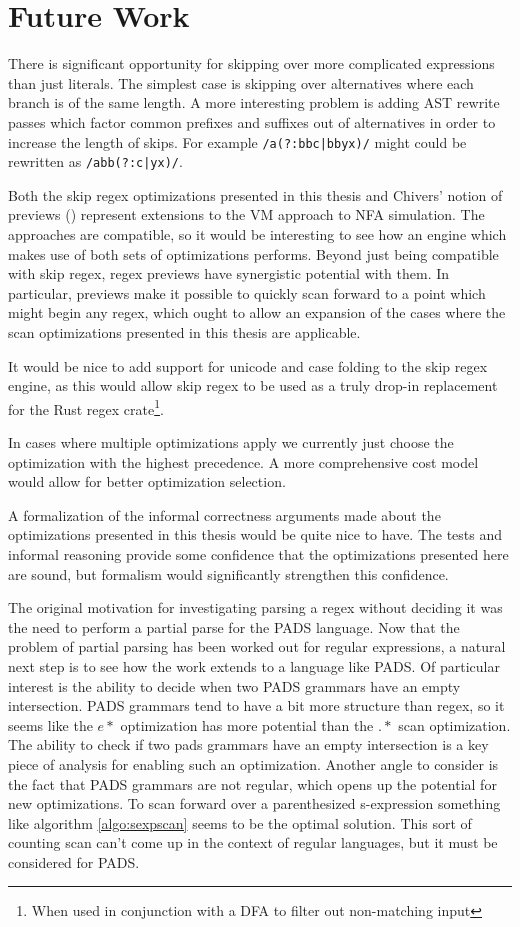 \chapter{Future Work}
\label{chapter:futurework}

There is significant opportunity for skipping over more complicated
expressions than just literals. The simplest case is skipping over
alternatives where each branch is of the same length. A more interesting
problem is adding AST rewrite passes which factor common prefixes and
suffixes out of alternatives in order to increase the length of skips.
For example \verb'/a(?:bbc|bbyx)/' might could be rewritten as
\verb'/abb(?:c|yx)/'.

Both the skip regex optimizations presented in this thesis and
Chivers' notion of previews (\cite{Chivers2016}) represent
extensions to the VM approach to NFA simulation. The approaches
are compatible, so it would be interesting to see how an engine
which makes use of both sets of optimizations performs. Beyond
just being compatible with skip regex, regex previews have
synergistic potential with them. In particular, previews make
it possible to quickly scan forward to a point which might begin
any regex, which ought to allow an expansion of the cases where
the scan optimizations presented in this thesis are applicable.

It would be nice to add support for unicode and case folding to
the skip regex engine, as this would allow skip regex to be used
as a truly drop-in replacement for the Rust regex crate\footnote{
When used in conjunction with a DFA to filter out non-matching
input}.

In cases where multiple optimizations apply we currently just
choose the optimization with the highest precedence. A more comprehensive
cost model would allow for better optimization selection.

A formalization of the informal correctness arguments made about
the optimizations presented in this thesis would be quite nice
to have. The tests and informal reasoning provide some confidence
that the optimizations presented here are sound, but formalism
would significantly strengthen this confidence.

The original motivation for investigating parsing a regex without
deciding it was the need to perform a partial parse for the PADS
language. Now that the problem of partial parsing has been worked
out for regular expressions, a natural next step is to see how
the work extends to a language like PADS. Of particular interest
is the ability to decide when two PADS grammars have an empty
intersection. PADS grammars tend to have a bit more structure
than regex, so it seems like the $e*$ optimization has more
potential than the $.*$ scan optimization. The ability to check
if two pads grammars have an empty intersection is a key piece
of analysis for enabling such an optimization. Another angle
to consider is the fact that PADS grammars are not regular,
which opens up the potential for new optimizations. To scan
forward over a parenthesized s-expression something like
algorithm \ref{algo:sexpscan} seems to be the
optimal solution. This sort of counting scan can't come up
in the context of regular languages, but it must be considered for PADS.

